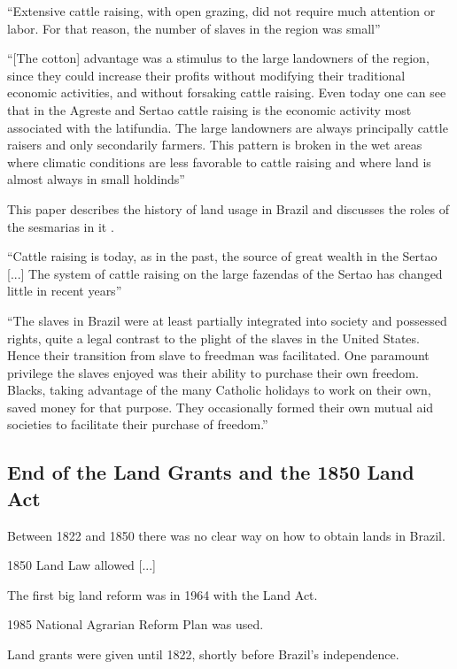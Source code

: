 \documentclass{article}
\begin{document}
\textcite[p.~113]{De_Oliveira_Andrade1980-xz}
``Extensive cattle raising, with open grazing, did not require much attention or labor. For that reason, the number of slaves in the region was small''

\textcite[p.~119]{De_Oliveira_Andrade1980-xz}
``[The cotton] advantage was a stimulus to the large landowners of the region, since they could increase their profits without modifying their traditional economic activities, and without forsaking cattle raising. Even today one can see that in the Agreste and Sertao cattle raising is the economic activity most associated with the latifundia. The large landowners are always principally cattle raisers and only secondarily farmers. This pattern is broken in the wet areas where climatic conditions are less favorable to cattle raising and where land is almost always in small holdinds''

This paper describes the history of land usage in Brazil and discusses the roles of the sesmarias in it \parencite{Reydon2015-ff}.

\textcite[p.~157]{De_Oliveira_Andrade1980-xz}
``Cattle raising is today, as in the past, the source of great wealth in the Sertao [...] The system of cattle raising on the large fazendas of the Sertao has changed little in recent years''

``The slaves in Brazil were at least partially integrated into society and possessed rights, quite a legal contrast to the plight of the slaves in the United States. Hence their transition from slave to freedman was facilitated. One paramount privilege the slaves enjoyed was their ability to purchase their
own freedom. Blacks, taking advantage of the many Catholic holidays to work on their own, saved money for that purpose. They occasionally formed their own mutual aid societies to facilitate their purchase of freedom.''

\subsection{End of the Land Grants and the 1850 Land Act}

Between 1822 and 1850 there was no clear way on how to obtain lands in Brazil.

1850 Land Law allowed [...]

The first big land reform was in 1964 with the Land Act.

1985 National Agrarian Reform Plan was used.

Land grants were given until 1822, shortly before Brazil's independence.
\end{document}
